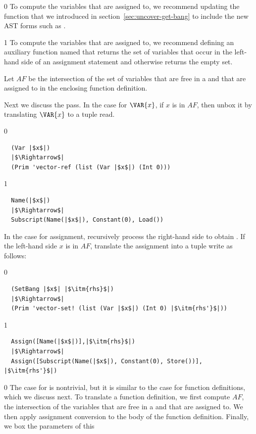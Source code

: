 \documentclass[7x10]{TimesAPriori_MIT}%
\def\racketEd{0}
\def\pythonEd{1}
\providecommand{\BookEdition}{1}
\let\edition\BookEdition
\newcommand{\pythonColor}[0]{}
\numberwithin{theorem}{chapter}
\numberwithin{definition}{chapter}
\numberwithin{equation}{chapter}
\begin{document}
{\if\edition\racketEd
%
To compute the variables that are assigned to, we recommend updating
the  function that we introduced in
section~\ref{sec:uncover-get-bang} to include the new AST forms such
as .
%
\fi}
  
{\if\edition\pythonEd\pythonColor
%
To compute the variables that are assigned to, we recommend defining
an auxiliary function named  that returns
the set of variables that occur in the left-hand side of an assignment
statement and otherwise returns the empty set.
%
\fi}

Let $\mathit{AF}$ be the intersection of the set of variables that are
free in a  and that are assigned to in the enclosing
function definition.

Next we discuss the  pass.  In the case for
$\VAR{x}$, if $x$ is in $\mathit{AF}$, then unbox it by translating
$\VAR{x}$ to a tuple read.
%
{\if\edition\racketEd
\begin{lstlisting}
  (Var |$x$|)
  |$\Rightarrow$|
  (Prim 'vector-ref (list (Var |$x$|) (Int 0)))
\end{lstlisting}
\fi}
%
{\if\edition\pythonEd\pythonColor
\begin{lstlisting}
  Name(|$x$|)
  |$\Rightarrow$|
  Subscript(Name(|$x$|), Constant(0), Load())
\end{lstlisting}
\fi}
%
\noindent In the case for assignment, recursively process the
right-hand side  to obtain .  If the left-hand side
$x$ is in $\mathit{AF}$, translate the assignment into a tuple write
as follows:
%
{\if\edition\racketEd
\begin{lstlisting}
  (SetBang |$x$| |$\itm{rhs}$|)
  |$\Rightarrow$|
  (Prim 'vector-set! (list (Var |$x$|) (Int 0) |$\itm{rhs'}$|))
\end{lstlisting}
\fi}
{\if\edition\pythonEd\pythonColor
\begin{lstlisting}
  Assign([Name(|$x$|)],|$\itm{rhs}$|)
  |$\Rightarrow$|
  Assign([Subscript(Name(|$x$|), Constant(0), Store())], |$\itm{rhs'}$|)
\end{lstlisting}
\fi}
%
{\if\edition\racketEd
The case for  is nontrivial, but it is similar to the
case for function definitions, which we discuss next.
\fi}
%
To translate a function definition, we first compute $\mathit{AF}$,
the intersection of the variables that are free in a  and
that are assigned to. We then apply assignment conversion to the body
of the function definition. Finally, we box the parameters of this
\end{document}
